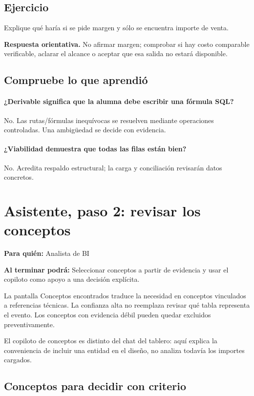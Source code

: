\subsection{Ejercicio}
Explique qué haría si se pide margen y sólo se encuentra importe de venta.

\textbf{Respuesta orientativa.} No afirmar margen; comprobar si hay costo comparable verificable, aclarar el alcance o aceptar que esa salida no estará disponible.

\subsection{Compruebe lo que aprendió}
\paragraph{¿Derivable significa que la alumna debe escribir una fórmula SQL?} No. Las rutas/fórmulas inequívocas se resuelven mediante operaciones controladas. Una ambigüedad se decide con evidencia.

\paragraph{¿Viabilidad demuestra que todas las filas están bien?} No. Acredita respaldo estructural; la carga y conciliación revisarán datos concretos.


\section{Asistente, paso 2: revisar los conceptos}
\label{unidad:BI04}
\textbf{Para quién:} Analista de BI\par
\textbf{Al terminar podrá:} Seleccionar conceptos a partir de evidencia y usar el copiloto como apoyo a una decisión explícita.

La pantalla Conceptos encontrados traduce la necesidad en conceptos vinculados a referencias técnicas. La confianza alta no reemplaza revisar qué tabla representa el evento. Los conceptos con evidencia débil pueden quedar excluidos preventivamente.

El copiloto de conceptos es distinto del chat del tablero: aquí explica la conveniencia de incluir una entidad en el diseño, no analiza todavía los importes cargados.

\subsection{Conceptos para decidir con criterio}
